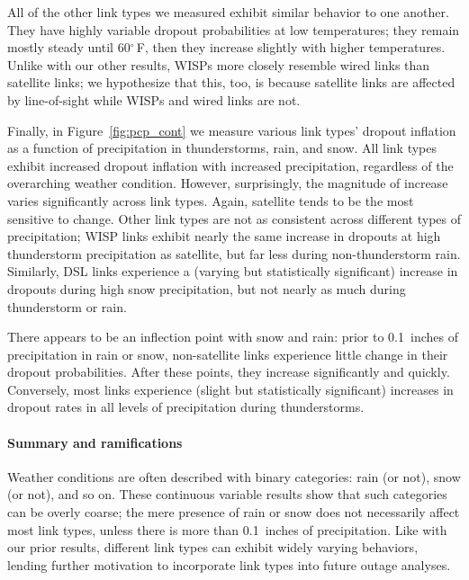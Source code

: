 All of the other link types we measured exhibit similar behavior to one
another.
%
They have highly variable dropout probabilities at low temperatures;
they remain mostly steady until 60$^\circ$\,F, then they increase slightly with
higher temperatures.
%
Unlike with our other results, WISPs more closely resemble wired links
than satellite links; we hypothesize that this, too, is because
satellite links are affected by line-of-sight while WISPs and wired
links are not.


Finally, in Figure~\ref{fig:pcp_cont} we measure various link types'
dropout inflation as a function of precipitation in thunderstorms,
rain, and snow.
%
All link types exhibit increased dropout inflation with increased
precipitation, regardless of the overarching weather condition.
%
However, surprisingly, the magnitude of increase varies significantly
across link types.
%
Again, satellite tends to be the most sensitive to change.
%
Other link types are not as consistent across different types of
precipitation; WISP links exhibit nearly the same increase in dropouts
at high thunderstorm precipitation as satellite, but far less during
non-thunderstorm rain.
%
Similarly, DSL links experience a (varying but statistically
significant) increase in dropouts during high snow precipitation, but
not nearly as much during thunderstorm or rain.


There appears to be an inflection point with snow and rain: prior to
0.1~inches of precipitation in rain or snow, non-satellite links
experience little change in their dropout probabilities.
%
After these points, they increase significantly and quickly.
%
Conversely, most links experience (slight but statistically significant)
increases in dropout rates in all levels of precipitation during
thunderstorms.



\paragraph{Summary and ramifications}
%
Weather conditions are often described with binary categories: rain (or
not), snow (or not), and so on.
%
These continuous variable results show that such categories can be
overly coarse; the mere presence of rain or snow does not necessarily
affect most link types, unless there is more than 0.1~inches of
precipitation.
%
Like with our prior results, different link types can exhibit widely
varying behaviors, lending further motivation to incorporate link types
into future outage analyses.


